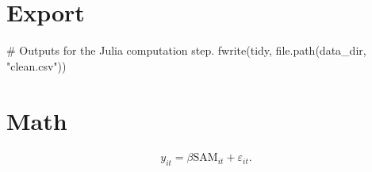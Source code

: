 \documentclass[
]{article}
\newenvironment{Shaded}{\begin{snugshade}}{\end{snugshade}}
\newcommand{\CommentTok}[1]{\textcolor[rgb]{0.37,0.37,0.37}{#1}}
\newcommand{\FunctionTok}[1]{\textcolor[rgb]{0.28,0.35,0.67}{#1}}
\newcommand{\NormalTok}[1]{\textcolor[rgb]{0.00,0.23,0.31}{#1}}
\newcommand{\StringTok}[1]{\textcolor[rgb]{0.13,0.47,0.30}{#1}}
\begin{document}
\section{Export}\label{export}

\begin{Shaded}
\begin{Highlighting}[]
\CommentTok{\# Outputs for the Julia computation step.}
\FunctionTok{fwrite}\NormalTok{(tidy, }\FunctionTok{file.path}\NormalTok{(data\_dir, }\StringTok{"clean.csv"}\NormalTok{))}
\end{Highlighting}
\end{Shaded}

\section{Math}\label{math}

\begin{align}
  y_{it} = \beta \text{SAM}_{it} + \varepsilon_{it}.
\end{align}
\end{document}
